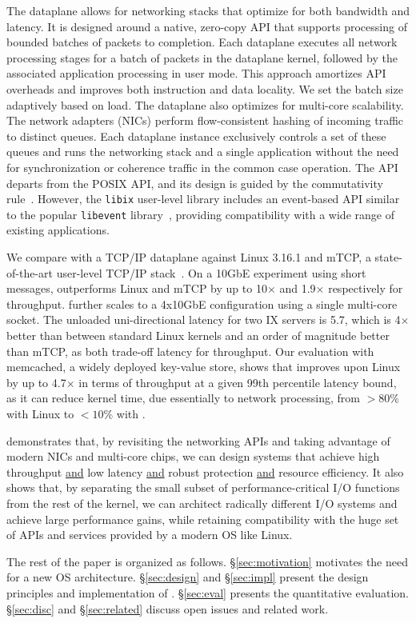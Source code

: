 The \ix dataplane allows for networking stacks that optimize for both
bandwidth and latency. It is designed around a native, zero-copy API
that supports processing of bounded batches of packets to
completion. Each dataplane executes all network processing stages
for a batch of packets in the dataplane kernel, followed by the associated application processing in user mode. This approach amortizes API
overheads and improves both instruction and data locality. We set the
batch size adaptively based on load. The \ix dataplane also optimizes
for multi-core scalability.  The network adapters (NICs) perform
flow-consistent hashing of incoming traffic to distinct queues. Each
dataplane instance exclusively controls a set of these queues and runs
the networking stack and a single application without the need for
synchronization or coherence traffic in the common case operation. The
\ix API departs from the POSIX API, and its design is guided by the commutativity
rule~\cite{DBLP:conf/sosp/ClementsKZMK13}.  However, the \texttt{libix}
user-level library includes an event-based API similar to the
popular \texttt{libevent} library~\cite{provos2003libevent}, providing
compatibility with a wide range of existing applications.

We compare \ix with a TCP/IP dataplane against Linux
3.16.1 and mTCP, a state-of-the-art user-level TCP/IP
stack~\cite{jeong2014mtcp}.  On a 10GbE experiment using short messages, \ix outperforms Linux and mTCP by up to
10$\times$ and 1.9$\times$ respectively for throughput. \ix
further scales to a 4x10GbE configuration using a single multi-core socket.
The unloaded uni-directional latency for two IX servers is
5.7\microsecond, which is 4$\times$ better than between standard
Linux kernels and an order of magnitude better than mTCP, as both
trade-off latency for throughput.  Our evaluation with memcached, a
widely deployed key-value store, shows that \ix improves upon Linux by
up to 4.7$\times$ in terms of throughput at a given 99th
percentile latency bound, as it can reduce kernel time, due
essentially to network processing, from $>80\%$ with Linux to
$<10\%$ with \ix.

\ix demonstrates that, by revisiting the networking APIs and taking
advantage of modern NICs and multi-core chips, we can design systems
that achieve high throughput \underline{and} low latency
\underline{and} robust protection \underline{and} resource
efficiency. It also shows that, by separating the small subset of
performance-critical I/O functions from the rest of the kernel, we can
architect radically different I/O systems and achieve large
performance gains, while retaining compatibility with the huge set of
APIs and services provided by a modern OS like Linux.

The rest of the paper is organized as follows. \S\ref{sec:motivation}
motivates the need for a new OS architecture. \S\ref{sec:design} and
\S\ref{sec:impl} present the design principles and implementation of
\ix.  \S\ref{sec:eval} presents the quantitative
evaluation. \S\ref{sec:disc} and \S\ref{sec:related} discuss open
issues and related work.



